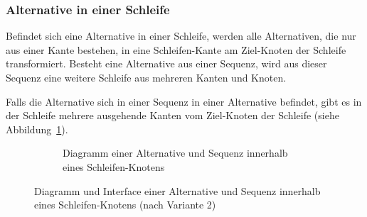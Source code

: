 \documentclass[../InterneDSLs.tex]{subfiles}
\begin{document}
\subsubsection{Alternative in einer Schleife}
Befindet sich eine Alternative in einer Schleife, werden alle Alternativen, die nur aus einer Kante bestehen, in eine Schleifen-Kante am Ziel-Knoten der Schleife transformiert. Besteht eine Alternative aus einer Sequenz, wird aus dieser Sequenz eine weitere Schleife aus mehreren Kanten und Knoten.

Falls die Alternative sich in einer Sequenz in einer Alternative befindet, gibt es in der Schleife mehrere ausgehende Kanten vom Ziel-Knoten der Schleife (siehe Abbildung~\ref{FIG:DiagramAlternativeInLoop}).
\begin{figure}[ht]
\centering
  \begin{subfigure}[c]{0.49\textwidth}
    \caption{Diagramm einer Alternative und Sequenz innerhalb eines Schleifen-Knotens}
    \label{FIG:DiagramAlternativeInLoop}
  \end{subfigure}
  \begin{subfigure}[c]{0.49\textwidth}
    
  \end{subfigure}
  \caption{Diagramm und Interface einer Alternative und Sequenz innerhalb eines Schleifen-Knotens (nach Variante 2)}
  \label{FIG:AlternativeInLoop}
\end{figure}
\end{document}
